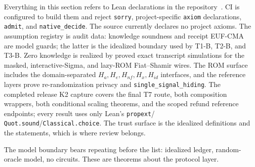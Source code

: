 \documentclass[9pt]{extarticle}
\newcommand{\decl}[1]{\nolinkurl{#1}}
\begin{document}
Everything in this section refers to Lean declarations in the
repository~\cite{zkpcrepo}. CI is configured to build them and reject
\texttt{sorry}, project-specific \texttt{axiom} declarations,
\texttt{admit}, and \texttt{native\_decide}. The source currently declares
no project axioms. The assumption registry is audit data: knowledge
soundness and receipt EUF-CMA are model guards; the latter is the idealized
boundary used by T1-B, T2-B, and T3-B. Zero knowledge is realized by proved
exact transcript simulations for the masked, interactive-Sigma, and
lazy-ROM Fiat--Shamir wires. The ROM surface includes the domain-separated
$H_a,H_e,H_{nf},H_x,H_{id}$ interfaces, and the reference layers prove
re-randomization privacy and \decl{single_signal_hiding}. The completed
release K2 capture covers the final T7 route, both composition wrappers,
both conditional scaling theorems, and the scoped refund reference
endpoints; every result uses only Lean's \texttt{propext}/
\texttt{Quot.sound}/\texttt{Classical.choice}. The trust surface is the idealized definitions and the
statements, which is where review belongs.

The model boundary bears repeating before the list: idealized ledger,
random-oracle model, no circuits. These are theorems about the protocol
layer.
\end{document}
